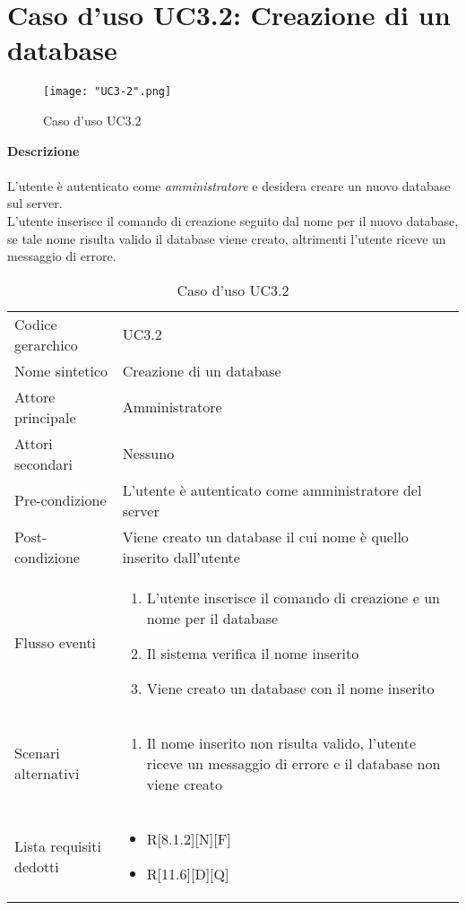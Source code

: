 \documentclass[a4paper]{report}
\begin{document}
	 \section{Caso d'uso UC3.2: Creazione di un database}
	 	\begin{figure}[H]
			\centering
			\texttt{[image: "UC3-2".png]}
			\caption{Caso d'uso UC3.2}
		\end{figure}
	 \textbf{Descrizione} \\ \\
	 L'utente è autenticato come \emph{amministratore} e desidera creare un nuovo database sul server. 
	 \\ L'utente inserisce il comando di creazione seguito dal nome per il nuovo database, se tale nome risulta
	  valido il database viene creato, altrimenti l'utente riceve un messaggio di errore. \\
		\begin{table}[H]
		\begin{tabularx}{\textwidth}{X | X}\toprule
			\rowcolor{orange!65}Codice gerarchico & UC3.2 \\
			Nome sintetico & Creazione di un database \\
			\rowcolor{orange!65}Attore principale & Amministratore\\
			Attori secondari & Nessuno \\
			\rowcolor{orange!65}Pre-condizione & L'utente è autenticato come amministratore del server\\
			Post-condizione & Viene creato un database il cui nome è quello inserito dall'utente \\
			\rowcolor{orange!65}Flusso eventi & \begin{enumerate}
			\item L'utente inserisce il comando di creazione e un nome per il database
			\item Il sistema verifica il nome inserito
			\item Viene creato un database con il nome inserito
			\end{enumerate} \\
			Scenari alternativi & \begin{enumerate}
			\item Il nome inserito non risulta valido, l'utente riceve un messaggio di errore e il database non
			 viene creato
			\end{enumerate} \\
			\rowcolor{orange!65}Lista requisiti dedotti & \begin{itemize}
				\item R[8.1.2][N][F]
				\item R[11.6][D][Q]
				\end{itemize} \\
			\bottomrule
		\end{tabularx}
		\caption{Caso d'uso UC3.2}
	 \end{table}
\end{document}
